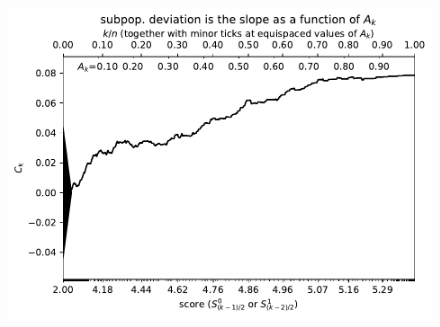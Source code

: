 \documentclass{article}
\newlength{\vertsep}
\newlength{\imsize}
\begin{document}
\begin{figure}
\begin{centering}

\parbox{\imsize}{\includegraphics[width=\imsize]
{../codes/weighted/County_of_San_Francisco_vs_Kern-LNGI/cumulative.pdf}}

\vspace{\vertsep}


\end{centering}
\end{figure}
\end{document}
